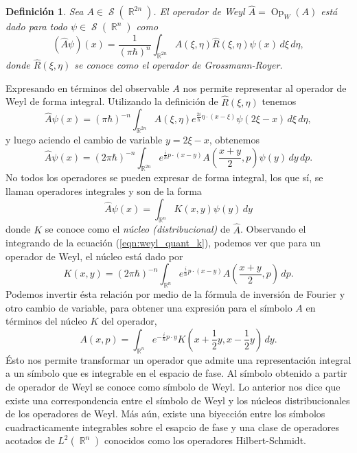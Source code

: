 \documentclass[a4paper]{report}
\DeclareMathOperator{\R}{\mathbb{R}}
\DeclareMathOperator{\Sz}{\mathcal S}
\DeclareMathOperator{\Op}{Op}
\newtheorem{definition}{Definición}
\begin{document}
  \begin{definition}
    Sea $A \in \Sz(\R^{2n})$. El operador de Weyl $\hat{A} =
    \Op_W(A)$ está dado para todo $\psi \in \Sz(\R^{n})$ 
    como
    \begin{equation}
      \left( \hat{A}\psi \right)(x)
      = \frac{1}{(\pi\hbar)^{n}} \int_{\R^{2n}}
      A(\xi,\eta)\hat{R}(\xi,\eta)\psi(x) \, d\xi \, d\eta,
    \end{equation}
    donde $\hat{R}(\xi,\eta)$ se conoce como el operador de
    Grossmann-Royer.
  \end{definition}

  Expresando en términos del observable $A$ nos permite
  representar al operador de Weyl de forma integral.
  Utilizando la definición de $\hat{R}(\xi,\eta)$ tenemos
  \[
    \hat{A}\psi(x)
    = (\pi\hbar)^{-n} \int_{\R^{2n}} A(\xi,\eta)
    e^{\frac{2i}{\hbar} \eta \cdot (x - \xi)} \psi(2\xi - x)
    \, d\xi \, d\eta,
  \] 
  y luego aciendo el cambio de variable $y = 2\xi - x$,
  obtenemos
  \begin{equation}
    \label{eqn:weyl_quant_k}
    \hat{A}\psi(x)
    = (2\pi\hbar)^{-n} \int_{\R^{2n}} e^{\frac{i}{\hbar} p
    \cdot (x - y)} A\left( \frac{x+y}{2}, p \right) \psi(y)
    \, dy \, dp.
  \end{equation}
  No todos los operadores se pueden expresar de forma
  integral, los que sí, se llaman operadores integrales y
  son de la forma
  \[
    \hat{A}\psi(x) = \int_{\R^{n}} K(x,y) \psi(y) \, dy
  \] 
  donde $K$ se conoce como el \textit{núcleo
  (distribucional)} de $\hat{A}$. Observando el integrando
  de la ecuación (\ref{eqn:weyl_quant_k}), podemos ver que
  para un operador de Weyl, el núcleo está dado por
  \begin{equation}
    K(x,y)
    = (2\pi\hbar)^{-n} \int_{\R^{n}} e^{\frac{i}{\hbar} p
    \cdot (x - y)}A\left( \frac{x+y}{2}, p \right) \, dp.
  \end{equation}
  Podemos invertir ésta relación por medio de la fórmula de
  inversión de Fourier y otro cambio de variable, para
  obtener una expresión para el símbolo $A$ en términos del
  núcleo $K$ del operador,
  \begin{equation}
    A(x,p)
    = \int_{\R^{n}} e^{-\frac{i}{\hbar} p \cdot y} K\left( x
    + \frac{1}{2}y, x - \frac{1}{2}y\right) \, dy.
  \end{equation}
  Ésto nos permite transformar un operador que admite una
  representación integral a un símbolo que es integrable en
  el espacio de fase. Al símbolo obtenido a partir de
  operador de Weyl se conoce como símbolo de Weyl. Lo
  anterior nos dice que existe una correspondencia entre el
  símbolo de Weyl y los núcleos distribucionales de los
  operadores de Weyl. Más aún, existe una biyección entre
  los símbolos cuadracticamente integrables sobre el esapcio
  de fase y una clase de operadores acotados de
  $L^2(\R^{n})$ conocidos como los operadores
  Hilbert-Schmidt.
\end{document}
